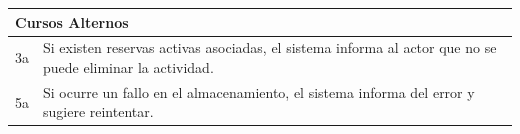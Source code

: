     \begin{table}[H]
        \begin{tabular}{llllllll}
        \hline
        \multicolumn{8}{|l|}{\cellcolor[HTML]{F2F2F2}Cursos Alternos}                                                                                                                                                                                                                                                                                \\ \hline
        \multicolumn{1}{|c|}{3a} & \multicolumn{7}{p{15cm}|}{{\color[HTML]{808080} Si existen reservas activas asociadas, el sistema informa al actor que no se puede eliminar la actividad.}}                                                                                                                                      \\ \hline
        \multicolumn{1}{|c|}{5a} & \multicolumn{7}{p{15cm}|}{{\color[HTML]{808080} Si ocurre un fallo en el almacenamiento, el sistema informa del error y sugiere reintentar.}}                                                                                                                                      \\ \hline
        \end{tabular}
    \end{table}

